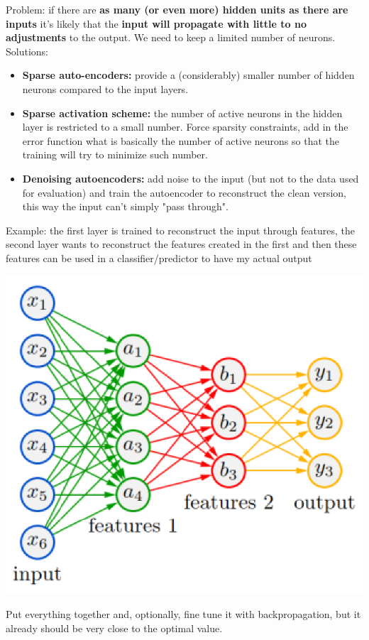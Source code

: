 \documentclass[11pt]{article}
\begin{document}
\begin{itemize}
			\newpage
			
			Problem: if there are \textbf{as many (or even more) hidden units as there are inputs} it's likely that the \textbf{input will propagate with little to no adjustments} to the output. We need to keep a limited number of neurons. Solutions: 
			\begin{itemize}
				\item \textbf{Sparse auto-encoders:} provide a (considerably) smaller number of hidden neurons compared to the input layers. 
				
				\item \textbf{Sparse activation scheme:} the number of active neurons in the hidden layer is restricted to a small number. Force sparsity constraints, add in the error function what is basically the number of active neurons so that the training will try to minimize such number.
				
				\item \textbf{Denoising autoencoders:} add noise to the input (but not to the data used for evaluation) and train the autoencoder to reconstruct the clean version, this way the input can't simply "pass through".
				
			\end{itemize}
			
			Example: the first layer is trained to reconstruct the input through features, the second layer wants to reconstruct the features created in the first and then these features can be used in a classifier/predictor to have my actual output
			\begin{center}
				\includegraphics[width=0.6\columnwidth]{img/NN/autoencoder2}
			\end{center}
			Put everything together and, optionally, fine tune it with backpropagation, but it already should be very close to the optimal value.
		\end{itemize}
		
\end{document}
